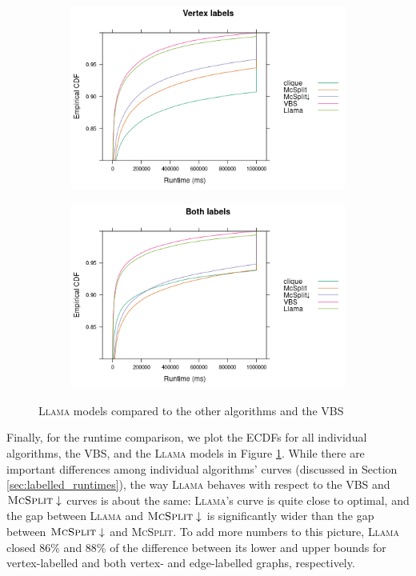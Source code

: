 \documentclass{l4proj}
\theoremstyle{definition}
\theoremstyle{remark}
\begin{document}
\begin{figure}
  \centering
  \begin{subfigure}[t]{0.49\textwidth}
    \centering
    \includegraphics[width=\textwidth]{images/ecdf_vertex_labels_llama.png}
  \end{subfigure}
  \begin{subfigure}[t]{0.49\textwidth}
    \centering
    \includegraphics[width=\textwidth]{images/ecdf_both_labels_llama.png}
  \end{subfigure}
  \caption{\textsc{Llama} models compared to the other algorithms and the VBS}
  \label{fig:ecdf_llama}
\end{figure}

Finally, for the runtime comparison, we plot the ECDFs for all individual
algorithms, the VBS, and the \textsc{Llama} models in Figure
\ref{fig:ecdf_llama}. While there are important differences among individual
algorithms' curves (discussed in Section \ref{sec:labelled_runtimes}), the way
\textsc{Llama} behaves with respect to the VBS and $\textsc{McSplit}\downarrow$
curves is about the same: \textsc{Llama}'s curve is quite close to optimal, and
the gap between \textsc{Llama} and $\textsc{McSplit}\downarrow$ is significantly
wider than the gap between $\textsc{McSplit}\downarrow$ and \textsc{McSplit}. To
add more numbers to this picture, \textsc{Llama} closed 86\% and 88\% of the
difference between its lower and upper bounds for vertex-labelled and both
vertex- and edge-labelled graphs, respectively.
\end{document}
